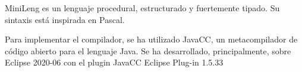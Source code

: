 \documentclass[a4paper,10pt]{article}
\begin{document}
MiniLeng es un lenguaje procedural, estructurado y fuertemente tipado. Su sintaxis está inspirada en Pascal.

Para implementar el compilador, se ha utilizado JavaCC, un metacompilador de código abierto para el lenguaje Java. Se ha desarrollado, principalmente, sobre Eclipse 2020-06 con el plugin JavaCC Eclipse Plug-in 1.5.33



\pagebreak

\begin{spacing}{0.1}
\tableofcontents
\end{spacing}

\pagebreak

\setcounter{page}{1}

\pagestyle{fancy}









\renewcommand\appendixname{Anexo}
\begin{appendices}


\end{appendices}

\clearpage{}
\newpage
\nocite{*}
\printbibliography
\end{document}
